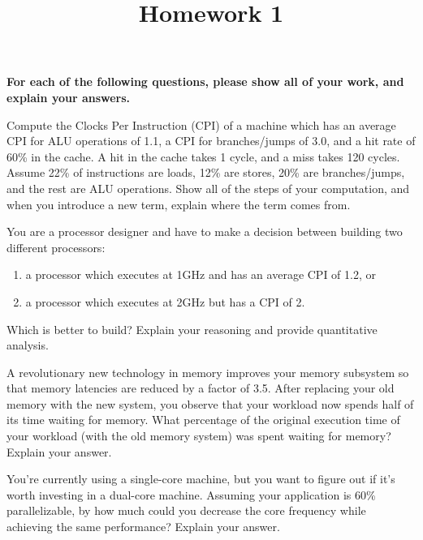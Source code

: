\documentclass{exam}
\title{Homework 1}
\author{}
\begin{document}
\maketitle
\thispagestyle{foot}

\textbf{For each of the following questions, please show all of your work, and
explain your answers.}

\begin{questions}
    \question[12.5]
        Compute the Clocks Per Instruction (CPI) of a machine which has an
        average CPI for ALU operations of 1.1, a CPI for branches/jumps of 3.0,
        and a hit rate of 60\% in the cache. A hit in the cache takes 1 cycle,
        and a miss takes 120 cycles. Assume 22\% of instructions are loads, 12\%
        are stores, 20\% are branches/jumps, and the rest are ALU operations.
        Show all of the steps of your computation, and when you introduce a new
        term, explain where the term comes from.


    \question[12.5]
        You are a processor designer and have to make a decision between
        building two different processors:
        \begin{enumerate}
            \item a processor which executes at 1GHz and has an average CPI of
                1.2, or
            \item a processor which executes at 2GHz but has a CPI of 2.
        \end{enumerate}
        Which is better to build? Explain your reasoning and provide
        quantitative analysis.


    \newpage

    \question[12.5]
        A revolutionary new technology in memory improves your memory subsystem
        so that memory latencies are reduced by a factor of 3.5. After replacing
        your old memory with the new system, you observe that your workload now
        spends half of its time waiting for memory. What percentage of the
        original execution time of your workload (with the old memory system)
        was spent waiting for memory? Explain your answer.


    \question[12.5]
        You're currently using a single-core machine, but you want to figure out
        if it's worth investing in a dual-core machine. Assuming your
        application is 60\% parallelizable, by how much could you decrease the
        core frequency while achieving the same performance? Explain your
        answer.


\end{questions}
\end{document}

